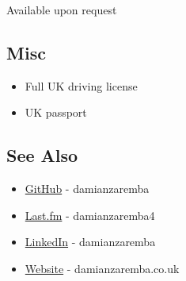 Available upon request

\subsection{Misc}

\begin{itemize}
\item
  Full UK driving license
\item
  UK passport
\end{itemize}
\subsection{See Also}

\begin{itemize}
\item
  \href{https://github.com/damianzaremba}{GitHub} - damianzaremba
\item
  \href{http://last.fm/user/damianzaremba4}{Last.fm} - damianzaremba4
\item
  \href{http://uk.linkedin.com/in/damianzaremba}{LinkedIn} -
  damianzaremba
\item
  \href{http://damianzaremba.co.uk}{Website} - damianzaremba.co.uk
\end{itemize}
